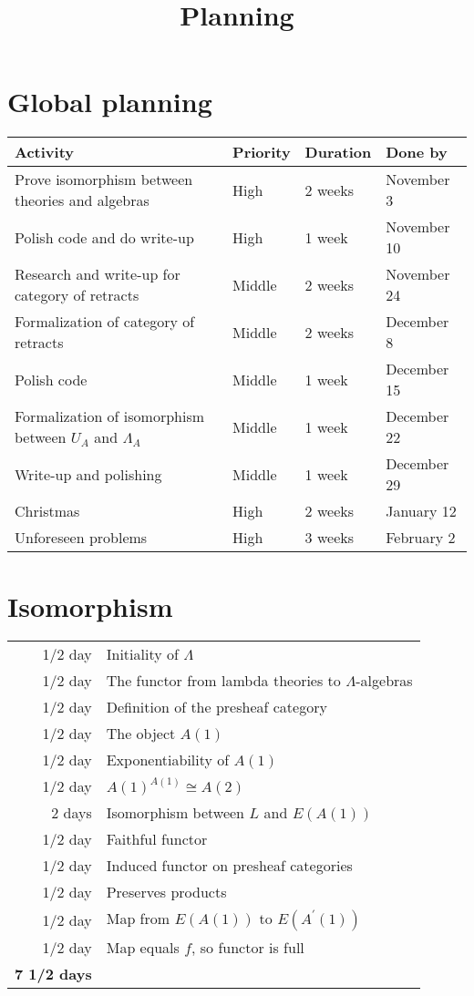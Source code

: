 \documentclass{amsart}
\title{Planning}
\begin{document}
  \maketitle

  \section{Global planning}
  \begin{tabular}{l|l|l|l}
    \textbf{Activity} & \textbf{Priority} & \textbf{Duration} & \textbf{Done by}\\\hline
    Prove isomorphism between theories and algebras & High & 2 weeks & November 3\\\hline
    Polish code and do write-up & High & 1 week & November 10\\\hline
    Research and write-up for category of retracts & Middle & 2 weeks & November 24\\\hline
    Formalization of category of retracts & Middle & 2 weeks & December 8\\\hline
    Polish code & Middle & 1 week & December 15\\\hline
    Formalization of isomorphism between $ U_A $ and $ \Lambda_A $ & Middle & 1 week & December 22\\\hline
    Write-up and polishing & Middle & 1 week & December 29\\\hline
    Christmas & High & 2 weeks & January 12\\\hline
    Unforeseen problems & High & 3 weeks & February 2
  \end{tabular}

  \section{Isomorphism}
  \begin{tabular}{r|l}
    1/2 day\phantom{s} & Initiality of $ \Lambda $\\
    1/2 day\phantom{s} & The functor from lambda theories to $ \Lambda $-algebras\\
    1/2 day\phantom{s} & Definition of the presheaf category\\
    1/2 day\phantom{s} & The object $ A(1) $\\
    1/2 day\phantom{s} & Exponentiability of $ A(1) $\\
    1/2 day\phantom{s} & $ A(1)^{A(1)} \cong A(2) $\\
    2 days & Isomorphism between $ L $ and $ E(A(1)) $\\
    1/2 day\phantom{s} & Faithful functor\\
    1/2 day\phantom{s} & Induced functor on presheaf categories\\
    1/2 day\phantom{s} & Preserves products\\
    1/2 day\phantom{s} & Map from $ E(A(1)) $ to $ E(A^\prime(1)) $\\
    1/2 day\phantom{s} & Map equals $ f $, so functor is full\\\hline
    \textbf{7 1/2 days}
  \end{tabular}
\end{document}
